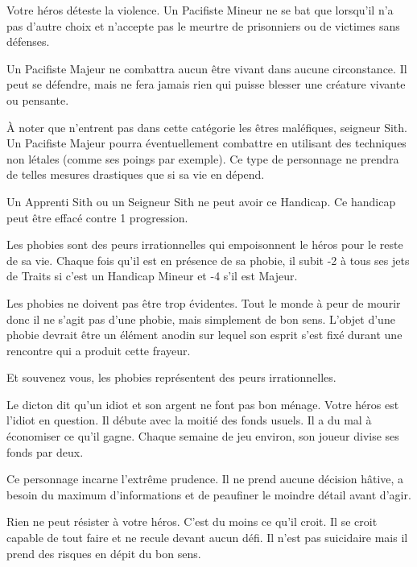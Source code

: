\begin{description}[align=left]
    \item [Pacifiste (Mineur ou Majeur)]
        Votre héros déteste la violence. Un Pacifiste Mineur ne se bat que lorsqu'il n'a pas d'autre choix et n'accepte pas le meurtre de prisonniers ou de victimes sans défenses. 

        Un Pacifiste Majeur ne combattra aucun être vivant dans aucune circonstance. Il peut se défendre, mais ne fera jamais rien qui puisse blesser une créature vivante ou pensante. 

        À noter que n'entrent pas dans cette catégorie les êtres maléfiques, seigneur Sith. Un Pacifiste Majeur pourra éventuellement combattre en utilisant des techniques non létales (comme ses poings par exemple). Ce type de personnage ne prendra de telles mesures drastiques que si sa vie en dépend.

        Un Apprenti Sith ou un Seigneur Sith ne peut avoir ce Handicap. Ce handicap peut être effacé contre 1 progression.

    \item [Phobie (Mineur ou Majeur)]
        Les phobies sont des peurs irrationnelles qui empoisonnent le héros pour le reste de sa vie. Chaque fois qu'il est en présence de sa phobie, il subit -2 à tous ses jets de Traits si c'est un Handicap Mineur et -4 s'il est Majeur. 

        Les phobies ne doivent pas être trop évidentes. Tout le monde à peur de mourir donc il ne s'agit pas d'une phobie, mais simplement de bon sens. L'objet d'une phobie devrait être un élément anodin sur lequel son esprit s'est fixé durant une rencontre qui a produit cette frayeur.

        Et souvenez vous, les phobies représentent des peurs irrationnelles.

    \item [Poches percées (Mineur)]
        Le dicton dit qu'un idiot et son argent ne font pas bon ménage. Votre héros est l'idiot en question. Il débute avec la moitié des fonds usuels. Il a du mal à économiser ce qu'il gagne. Chaque semaine de jeu environ, son joueur divise ses fonds par deux.

    \item [Prudent (Mineur)]
        Ce personnage incarne l'extrême prudence. Il ne prend aucune décision hâtive, a besoin du maximum d'informations et de peaufiner le moindre détail avant d'agir.

    \item [Présomptueux (Majeur)]
        Rien ne peut résister à votre héros. C'est du moins ce qu'il croit. Il se croit capable de tout faire et ne recule devant aucun défi. Il n'est pas suicidaire mais il prend des risques en dépit du bon sens.


\end{description}
